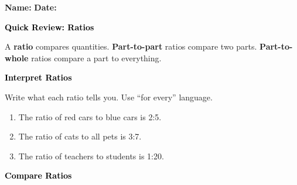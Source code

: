 \documentclass[12pt, letterpaper, fleqn]{article}
\begin{document}
\textbf{Name:} \underline{\hspace{5cm}}
\hfill
\textbf{Date:} \underline{\hspace{3cm}}\\

\begin{tcolorbox}[colback=customteal!20]
    \large\textcolor{black}{\textbf{Quick Review: Ratios}}
\end{tcolorbox}

\vspace{3mm}

\noindent
A \textbf{ratio} compares quantities. \textbf{Part-to-part} ratios compare two parts. \textbf{Part-to-whole} ratios compare a part to everything.

\vspace{4mm}

\begin{tcolorbox}[colback=customteal!20]
\large\textcolor{black}{\textbf{Interpret Ratios}}
\end{tcolorbox}

\noindent
Write what each ratio tells you. Use ``for every'' language.

\vspace{3mm}

\begin{enumerate}[itemsep=2cm, leftmargin=0.6cm]

\item The ratio of red cars to blue cars is 2:5.

\vspace{1.2cm}

\item The ratio of cats to all pets is 3:7.

\vspace{1.2cm}

\item The ratio of teachers to students is 1:20.

\vspace{1.2cm}

\end{enumerate}

\newpage

\begin{tcolorbox}[colback=customteal!20]
\large\textcolor{black}{\textbf{Compare Ratios}}
\end{tcolorbox}
\end{document}
